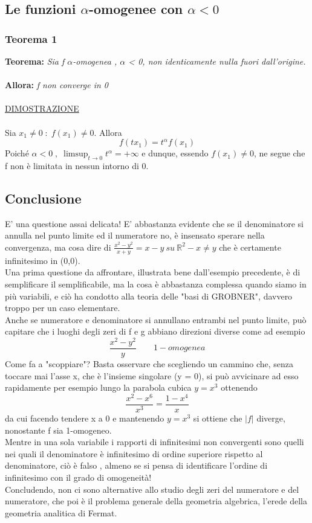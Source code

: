 \documentclass[fontsize = 20px, paper = a4]{article}
\begin{document}
\subsection{Le funzioni $\alpha$-omogenee con $\alpha < 0$}
\subsubsection{Teorema 1}
\textbf{Teorema:} \emph{Sia f $\alpha$-omogenea , $\alpha$ < 0, non identicamente nulla fuori dall'origine.}\\ \\
\textbf{Allora: } \emph{f non converge in 0} \\ \\
\underline{DIMOSTRAZIONE} \\ \\
Sia $x_1 \neq 0 \; : \; f(x_1) \neq 0$. Allora 
$$f(tx_1) =  t^\alpha f(x_1)$$
Poiché $\alpha < 0 \; , \; \limsup_{t \to 0}t^\alpha = +\infty$ e dunque, essendo $f(x_1) \neq 0$, ne segue che f non è limitata in nessun intorno  di 0. 
\subsection{Conclusione}
E' una questione assai delicata! E' abbastanza evidente che se il denominatore si annulla nel punto limite ed il numeratore no, è insensato sperare nella convergenza, ma cosa dire di $\frac{x^2 - y^2}{x + y} = x-y \ su \ \mathbb{R}^2 - {x \neq y}$ che è certamente infinitesimo in (0,0). \\
Una prima questione da affrontare, illustrata bene dall'esempio precedente, è di semplificare il semplificabile, ma la cosa è abbastanza complessa quando siamo in più variabili, e ciò ha condotto alla teoria delle "basi di GROBNER", davvero troppo per un caso elementare. \\
Anche se numeratore e denominatore si annullano entrambi nel punto limite, può capitare che i luoghi degli zeri di f e g abbiano direzioni diverse come ad esempio
$$\frac{x^2 - y^2}{y} \qquad 1-omogenea$$
Come fa a "scoppiare"? Basta osservare che scegliendo un cammino che, senza toccare mai l'asse x, che è l'insieme singolare (y = 0), si può avvicinare ad esso rapidamente per esempio lungo la parabola cubica $y = x^3$ ottenendo
$$\frac{x^2 - x^6}{x^3} = \frac{1 - x^4}{x}$$
da cui facendo tendere x a 0 e mantenendo $y = x^3$ si ottiene che $| f | $ diverge, nonostante f sia 1-omogeneo. \\
Mentre in una sola variabile i rapporti di infinitesimi non convergenti sono quelli nei quali il denominatore è infinitesimo di ordine superiore rispetto al denominatore, ciò è falso , almeno se si pensa di identificare l'ordine di infinitesimo con il grado di omogeneità! \\
Concludendo, non ci sono alternative allo studio degli zeri del numeratore e del numeratore, che poi è il problema generale della geometria algebrica, l'erede della geometria analitica di Fermat.
\end{document}

